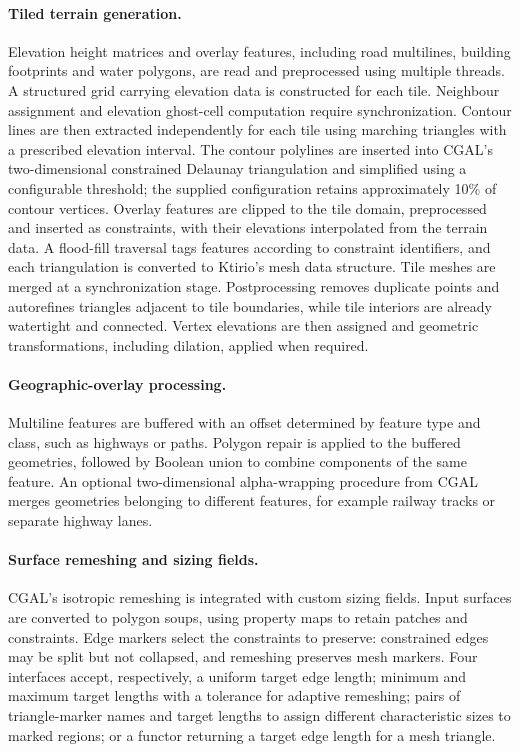 \paragraph{Tiled terrain generation.}
Elevation height matrices and overlay features, including road multilines,
building footprints and water polygons, are read and preprocessed using
multiple threads. A structured grid carrying elevation data is constructed
for each tile. Neighbour assignment and elevation ghost-cell computation
require synchronization. Contour lines are then extracted independently for
each tile using marching triangles with a prescribed elevation interval.
The contour polylines are inserted into CGAL's two-dimensional constrained
Delaunay triangulation and simplified using a configurable threshold;
the supplied configuration retains approximately 10\% of contour vertices.
Overlay features are clipped to the tile domain, preprocessed and inserted
as constraints, with their elevations interpolated from the terrain data.
A flood-fill traversal tags features according to constraint identifiers,
and each triangulation is converted to Ktirio's mesh data structure.
Tile meshes are merged at a synchronization stage. Postprocessing removes
duplicate points and autorefines triangles adjacent to tile boundaries,
while tile interiors are already watertight and connected. Vertex elevations
are then assigned and geometric transformations, including dilation, applied
when required.

\paragraph{Geographic-overlay processing.}
Multiline features are buffered with an offset determined by feature type
and class, such as highways or paths. Polygon repair is applied to the
buffered geometries, followed by Boolean union to combine components of
the same feature. An optional two-dimensional alpha-wrapping procedure from
CGAL merges geometries belonging to different features, for example railway
tracks or separate highway lanes.

\paragraph{Surface remeshing and sizing fields.}
CGAL's isotropic remeshing is integrated with custom sizing fields. Input
surfaces are converted to polygon soups, using property maps to retain
patches and constraints. Edge markers select the constraints to preserve:
constrained edges may be split but not collapsed, and remeshing preserves
mesh markers. Four interfaces accept, respectively, a uniform
target edge length; minimum and maximum target lengths with a tolerance
for adaptive remeshing; pairs of triangle-marker names and target lengths
to assign different characteristic sizes to marked regions; or a functor
returning a target edge length for a mesh triangle.


